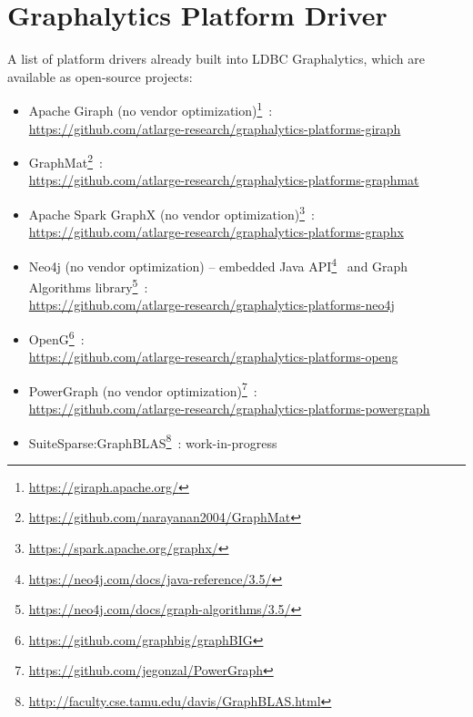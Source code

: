 \section{Graphalytics Platform Driver}\label{sec:instructions:drivers}
A list of platform drivers already built into LDBC Graphalytics, which are available as open-source projects:

\begin{itemize}
	\item Apache Giraph (no vendor optimization)\footnote{\url{https://giraph.apache.org/}}~\cite{DBLP:books/sp/SOAK2016}: \\ \url{https://github.com/atlarge-research/graphalytics-platforms-giraph}
	\item GraphMat\footnote{\url{https://github.com/narayanan2004/GraphMat}}~\cite{DBLP:journals/pvldb/SundaramSPDAV0D15}: \\ \url{https://github.com/atlarge-research/graphalytics-platforms-graphmat}
	\item Apache Spark GraphX (no vendor optimization)\footnote{\url{https://spark.apache.org/graphx/}}~\cite{DBLP:conf/sigmod/XinGFS13}: \\ \url{https://github.com/atlarge-research/graphalytics-platforms-graphx}
	\item Neo4j (no vendor optimization) --
	embedded Java API\footnote{\url{https://neo4j.com/docs/java-reference/3.5/}}~\cite{GraphDatabases} and
	Graph Algorithms library\footnote{\url{https://neo4j.com/docs/graph-algorithms/3.5/}}~\cite{	graph_algorithms_book}: \\ \url{https://github.com/atlarge-research/graphalytics-platforms-neo4j}
	\item OpenG\footnote{\url{https://github.com/graphbig/graphBIG}}~\cite{DBLP:conf/sc/NaiXTKL15}: \\ \url{https://github.com/atlarge-research/graphalytics-platforms-openg}
	\item PowerGraph (no vendor optimization)\footnote{\url{https://github.com/jegonzal/PowerGraph}}~\cite{DBLP:conf/osdi/GonzalezXDCFS14}: \\ \url{https://github.com/atlarge-research/graphalytics-platforms-powergraph}
	\item SuiteSparse:GraphBLAS\footnote{\url{http://faculty.cse.tamu.edu/davis/GraphBLAS.html}}~\cite{DBLP:conf/hpec/Davis18}: work-in-progress
\end{itemize}

